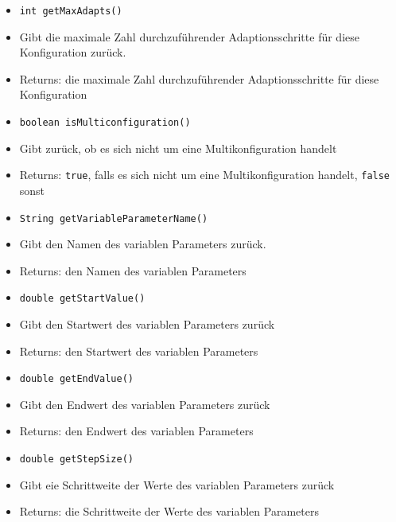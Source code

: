 \documentclass[parskip=full,11pt]{scrartcl}
\begin{document}
\begin{itemize}
	\item \texttt{int getMaxAdapts()}
	\item[] Gibt die maximale Zahl durchzuführender Adaptionsschritte für diese Konfiguration zurück.
	\item[] Returns: die maximale Zahl durchzuführender Adaptionsschritte für diese Konfiguration
	
	\item \texttt{boolean isMulticonfiguration()}
	\item[] Gibt zurück, ob es sich nicht um eine Multikonfiguration handelt
	\item[] Returns: \texttt{true}, falls es sich nicht um eine Multikonfiguration handelt, \texttt{false} sonst
	
	\item \texttt{String getVariableParameterName()}
	\item[] Gibt den Namen des variablen Parameters zurück.
	\item[] Returns: den Namen des variablen Parameters
	
	\item \texttt{double getStartValue()}
	\item[] Gibt den Startwert des variablen Parameters zurück
	\item[] Returns: den Startwert des variablen Parameters
	
	\item \texttt{double getEndValue()}
	\item[] Gibt den Endwert des variablen Parameters zurück
	\item[] Returns: den Endwert des variablen Parameters
	
	\item \texttt{double getStepSize()}
	\item[] Gibt eie Schrittweite der Werte des variablen Parameters zurück
	\item[] Returns: die Schrittweite der Werte des variablen Parameters
	
	
\end{itemize}
\end{document}
